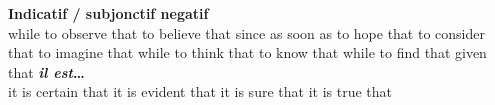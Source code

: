{\sffamily\bfseries Indicatif /{\color{myblue} subjonctif negatif}}\\
   {while}
   {to observe that}
   {to believe that}
   {since}
   {as soon as}
   {to hope that}
   {to consider that}
   {to imagine that}
   {while}
   {to think that}
   {to know that}
   {while}
   {to find that}
   {given that}
     {\bf {\em il est}\ldots}\\
        {it is certain that}
        {it is evident that}
        {it is sure that}
        {it is true that}



